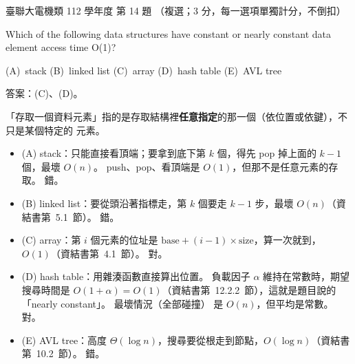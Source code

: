 \begin{pastexam}[label={px:ust-112-ee-ds-14}]{臺聯大電機類 112 學年度 第 14 題}
（複選；3 分，每一選項單獨計分，不倒扣）

Which of the following data structures have constant or nearly constant data element access time
O(1)?

(A)~stack \qquad (B)~linked list \qquad (C)~array \qquad (D)~hash table \qquad (E)~AVL tree
\end{pastexam}

\begin{pastsoln}
答案：(C)、(D)。

「存取一個資料元素」指的是存取結構裡\textbf{任意指定}的那一個（依位置或依鍵），不只是某個特定的
元素。

\begin{itemize}
\item (A) stack：只能直接看頂端；要拿到底下第 $k$ 個，得先 pop 掉上面的 $k - 1$ 個，最壞
$O(n)$。 push、pop、看頂端是 $O(1)$，但那不是任意元素的存取。 錯。
\item (B) linked list：要從頭沿著指標走，第 $k$ 個要走 $k - 1$ 步，最壞 $O(n)$（資結書第~5.1~節）。 錯。
\item (C) array：第 $i$ 個元素的位址是 $\text{base} + (i - 1) \times \text{size}$，算一次就到，
$O(1)$（資結書第~4.1~節）。 對。
\item (D) hash table：用雜湊函數直接算出位置。 負載因子 $\alpha$ 維持在常數時，期望搜尋時間是
$O(1 + \alpha) = O(1)$（資結書第~12.2.2~節），這就是題目說的「nearly constant」。 最壞情況（全部碰撞）
是 $O(n)$，但平均是常數。 對。
\item (E) AVL tree：高度 $\Theta(\log n)$，搜尋要從根走到節點，$O(\log n)$（資結書第~10.2~節）。 錯。
\end{itemize}
\end{pastsoln}
